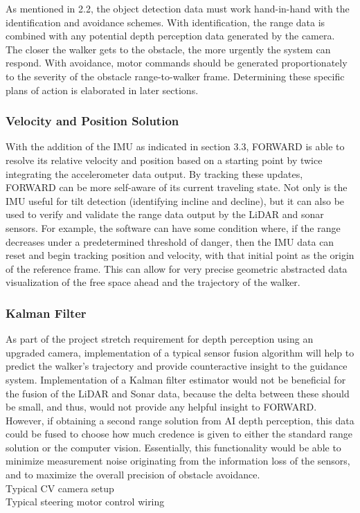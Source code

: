 \noindent As mentioned in 2.2, the object detection data must work hand-in-hand with the identification and avoidance schemes. With identification, the range data is combined with any potential depth perception data generated by the camera. The closer the walker gets to the obstacle, the more urgently the system can respond. With avoidance, motor commands should be generated proportionately to the severity of the obstacle range-to-walker frame. Determining these specific plans of action is elaborated in later sections.\\

\subsubsection{Velocity and Position Solution}
\noindent With the addition of the IMU as indicated in section 3.3, FORWARD is able to resolve its relative velocity and position based on a starting point by twice integrating the accelerometer data output. By tracking these updates, FORWARD can be more self-aware of its current traveling state. Not only is the IMU useful for tilt detection (identifying incline and decline), but it can also be used to verify and validate the range data output by the LiDAR and sonar sensors. For example, the software can have some condition where, if the range decreases under a predetermined threshold of danger, then the IMU data can reset and begin tracking position and velocity, with that initial point as the origin of the reference frame. This can allow for very precise geometric abstracted data visualization of the free space ahead and the trajectory of the walker.\\

\subsubsection{Kalman Filter}
\noindent As part of the project stretch requirement for depth perception using an upgraded camera, implementation of a typical sensor fusion algorithm will help to predict the walker's trajectory and provide counteractive insight to the guidance system. Implementation of a Kalman filter estimator would not be beneficial for the fusion of the LiDAR and Sonar data, because the delta between these should be small, and thus, would not provide any helpful insight to FORWARD. However, if obtaining a second range solution from AI depth perception, this data could be fused to choose how much credence is given to either the standard range solution or the computer vision. Essentially, this functionality would be able to minimize measurement noise originating from the information loss of the sensors, and to maximize the overall precision of obstacle avoidance.\\

\noindent Typical CV camera setup\\

\noindent Typical steering motor control wiring\\